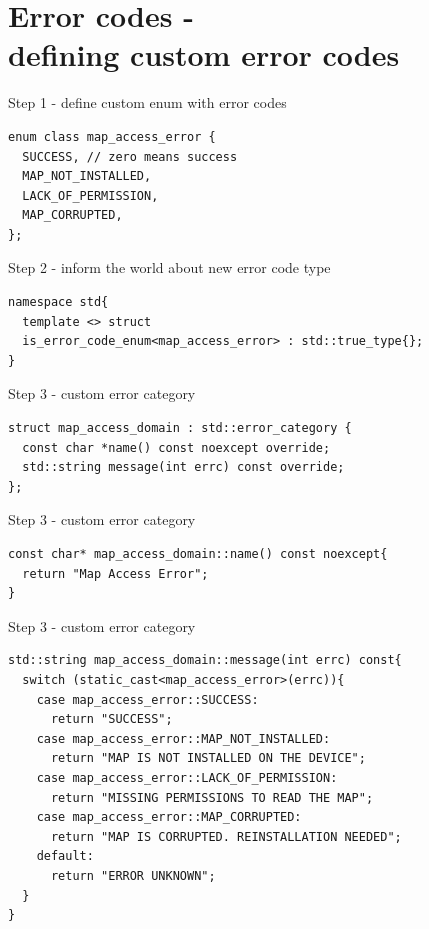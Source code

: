 \documentclass[10pt]{beamer}
\begin{document}
\section{Error codes - \\ defining custom error codes}

\begin{frame}[fragile]{Step 1 - define custom enum with error codes}
	\begin{verbatim}
enum class map_access_error {
  SUCCESS, // zero means success
  MAP_NOT_INSTALLED,
  LACK_OF_PERMISSION,
  MAP_CORRUPTED,
};
	\end{verbatim}
\end{frame}

\begin{frame}[fragile]{Step 2 - inform the world about new error code type}
\begin{verbatim}
namespace std{
  template <> struct
  is_error_code_enum<map_access_error> : std::true_type{};
}
\end{verbatim}
	
\end{frame}

\begin{frame}[fragile]{Step 3 - custom error category}
	
	\begin{verbatim}
struct map_access_domain : std::error_category {
  const char *name() const noexcept override;		
  std::string message(int errc) const override;
};
	\end{verbatim}
\end{frame}

\begin{frame}[fragile]{Step 3 - custom error category}
\begin{verbatim}
const char* map_access_domain::name() const noexcept{
  return "Map Access Error";
}
\end{verbatim}
\end{frame}

\begin{frame}[fragile]{Step 3 - custom error category}
	\begin{verbatim}
std::string map_access_domain::message(int errc) const{
  switch (static_cast<map_access_error>(errc)){
    case map_access_error::SUCCESS:
      return "SUCCESS";
    case map_access_error::MAP_NOT_INSTALLED:
      return "MAP IS NOT INSTALLED ON THE DEVICE";
    case map_access_error::LACK_OF_PERMISSION:
      return "MISSING PERMISSIONS TO READ THE MAP";
    case map_access_error::MAP_CORRUPTED:
      return "MAP IS CORRUPTED. REINSTALLATION NEEDED";
    default:
      return "ERROR UNKNOWN";
  }
}
	\end{verbatim}
\end{frame}
\end{document}
